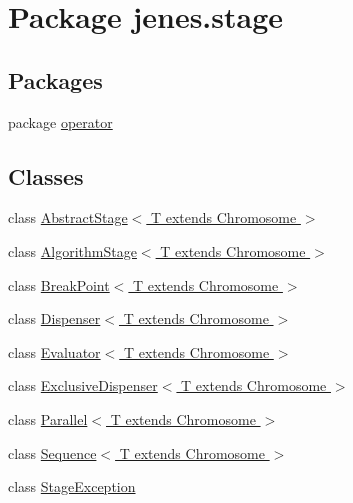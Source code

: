\hypertarget{namespacejenes_1_1stage}{\section{Package jenes.\-stage}
\label{namespacejenes_1_1stage}
}
\subsection*{Packages}
\begin{DoxyCompactItemize}
\item 
package \hyperlink{namespacejenes_1_1stage_1_1operator}{operator}
\end{DoxyCompactItemize}
\subsection*{Classes}
\begin{DoxyCompactItemize}
\item 
class \hyperlink{classjenes_1_1stage_1_1_abstract_stage_3_01_t_01extends_01_chromosome_01_4}{Abstract\-Stage$<$ T extends Chromosome $>$}
\item 
class \hyperlink{classjenes_1_1stage_1_1_algorithm_stage_3_01_t_01extends_01_chromosome_01_4}{Algorithm\-Stage$<$ T extends Chromosome $>$}
\item 
class \hyperlink{classjenes_1_1stage_1_1_break_point_3_01_t_01extends_01_chromosome_01_4}{Break\-Point$<$ T extends Chromosome $>$}
\item 
class \hyperlink{classjenes_1_1stage_1_1_dispenser_3_01_t_01extends_01_chromosome_01_4}{Dispenser$<$ T extends Chromosome $>$}
\item 
class \hyperlink{classjenes_1_1stage_1_1_evaluator_3_01_t_01extends_01_chromosome_01_4}{Evaluator$<$ T extends Chromosome $>$}
\item 
class \hyperlink{classjenes_1_1stage_1_1_exclusive_dispenser_3_01_t_01extends_01_chromosome_01_4}{Exclusive\-Dispenser$<$ T extends Chromosome $>$}
\item 
class \hyperlink{classjenes_1_1stage_1_1_parallel_3_01_t_01extends_01_chromosome_01_4}{Parallel$<$ T extends Chromosome $>$}
\item 
class \hyperlink{classjenes_1_1stage_1_1_sequence_3_01_t_01extends_01_chromosome_01_4}{Sequence$<$ T extends Chromosome $>$}
\item 
class \hyperlink{classjenes_1_1stage_1_1_stage_exception}{Stage\-Exception}
\end{DoxyCompactItemize}
